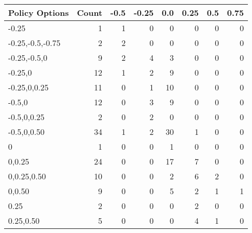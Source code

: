 \begin{tabular}{lrrrrrrr}
\toprule
   Policy Options &  Count &  -0.5 &  -0.25 &  0.0 &  0.25 &  0.5 &  0.75 \\
\midrule
            -0.25 &      1 &     1 &      0 &    0 &     0 &    0 &     0 \\
 -0.25,-0.5,-0.75 &      2 &     2 &      0 &    0 &     0 &    0 &     0 \\
     -0.25,-0.5,0 &      9 &     2 &      4 &    3 &     0 &    0 &     0 \\
          -0.25,0 &     12 &     1 &      2 &    9 &     0 &    0 &     0 \\
     -0.25,0,0.25 &     11 &     0 &      1 &   10 &     0 &    0 &     0 \\
           -0.5,0 &     12 &     0 &      3 &    9 &     0 &    0 &     0 \\
      -0.5,0,0.25 &      2 &     0 &      2 &    0 &     0 &    0 &     0 \\
      -0.5,0,0.50 &     34 &     1 &      2 &   30 &     1 &    0 &     0 \\
                0 &      1 &     0 &      0 &    1 &     0 &    0 &     0 \\
           0,0.25 &     24 &     0 &      0 &   17 &     7 &    0 &     0 \\
      0,0.25,0.50 &     10 &     0 &      0 &    2 &     6 &    2 &     0 \\
           0,0.50 &      9 &     0 &      0 &    5 &     2 &    1 &     1 \\
             0.25 &      2 &     0 &      0 &    0 &     2 &    0 &     0 \\
        0.25,0.50 &      5 &     0 &      0 &    0 &     4 &    1 &     0 \\
\bottomrule
\end{tabular}
